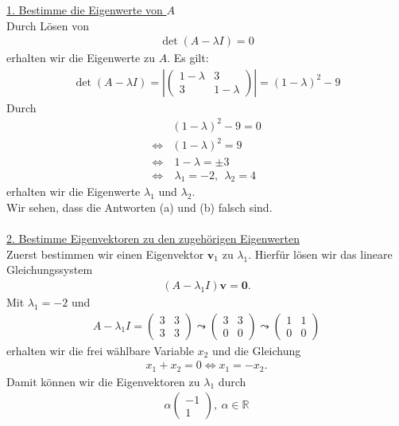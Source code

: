 \underline{1. Bestimme die Eigenwerte von $A$}\\
Durch Lösen von
\begin{align*}
\det(A - \lambda I ) = 0
\end{align*}
erhalten wir die Eigenwerte zu $A$.
Es gilt:
\begin{align*}
\det(A - \lambda I ) =
\left|
\begin{pmatrix}
1 - \lambda & 3 \\
3 & 1 - \lambda
\end{pmatrix}
\right|
=
(1- \lambda)^2 - 9
\end{align*}
Durch
\begin{align*}
&(1- \lambda)^2 - 9 = 0 \\
\Leftrightarrow
&(1- \lambda)^2 = 9 \\
\Leftrightarrow
&\ 1 - \lambda = \pm 3\\
\Leftrightarrow
&\ \lambda_1 = -2 , \ \ \lambda_2 = 4
\end{align*}
erhalten wir die Eigenwerte $\lambda_1$ und $\lambda_2$.\\
Wir sehen, dass die Antworten (a) und (b) falsch sind.\\
\\
\underline{2. Bestimme Eigenvektoren zu den zugehörigen Eigenwerten}\\
Zuerst bestimmen wir einen Eigenvektor $\textbf{v}_1$ zu $\lambda_1$.
Hierfür lösen wir das lineare Gleichungssystem
\begin{align*}
(A- \lambda_1 I ) \textbf{v} = \textbf{0}.
\end{align*}
Mit $ \lambda_1 = -2 $ und 
\begin{align*}
A- \lambda_1 I
=
\begin{pmatrix}
3 & 3 \\
3 & 3
\end{pmatrix} 
\leadsto
\begin{pmatrix}
3 & 3 \\
0 & 0
\end{pmatrix}
\leadsto
\begin{pmatrix}
1 & 1 \\
0 & 0
\end{pmatrix}
\end{align*}
erhalten wir die frei wählbare Variable $x_2$ und die 
Gleichung
\begin{align*}
x_1 + x_2 = 0
\Leftrightarrow
x_1 = -x_2.
\end{align*}
Damit können wir die Eigenvektoren zu $\lambda_1$ durch
\begin{align*}
\alpha 
\begin{pmatrix}
-1 \\
1
\end{pmatrix}
, \ \alpha \in \mathbb{R}
\end{align*}
